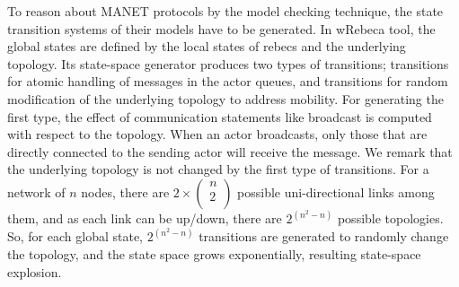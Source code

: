 To reason about MANET protocols by the model checking technique, the state transition systems of their models have to be generated. In wRebeca tool, the global states are defined by the local states of rebecs and the underlying topology. Its state-space generator produces two types of transitions; transitions for atomic handling of messages in the actor queues, and transitions for random modification of the underlying topology to address mobility.  For generating the first type, the effect of communication statements like broadcast is computed with respect to the topology. When an actor broadcasts, only those that are directly connected to the sending actor will receive the message. We remark that the underlying topology is not changed by the first type of transitions.   %
For a network of $n$ nodes, there are $2\times \begin{pmatrix}
n \\
2 \\
\end{pmatrix}$ possible uni-directional links among them, and as each link can be up/down, there are $2^{(n^2-n)}$ possible topologies. %
So, for each global state, $2^{(n^2-n)}$ transitions are generated to randomly change the topology, and the state space grows exponentially, resulting state-space explosion. %

